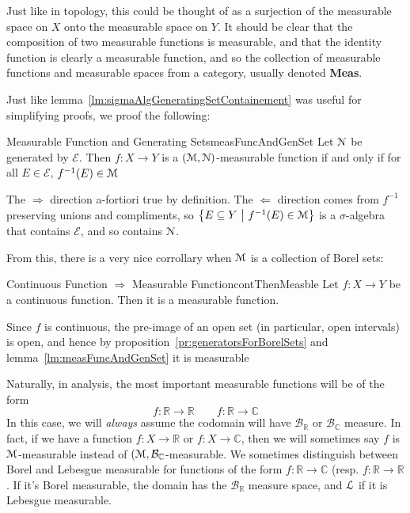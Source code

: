 \documentclass[oneside]{book}
\newcommand{\R}{\mathbb{R}}
\renewcommand{\C}{\mathbb{C}}
\newcommand{\CE}{\mathcal{E}}
\newcommand{\MM}{\EuScript{M}}
\newcommand{\EN}{\EuScript{N}}
\newcommand{\EL}{\EuScript{L}}
\newcommand{\BB}{\mathcal{B}}
\newcommand{\sse}{\subseteq}
\newcommand{\set}[2]{\left\{#1 \ \middle|\ #2\right\}}
\renewcommand{\bf}[1]{\textbf{#1}}
\newcommand{\rw}{\rightarrow}
\newcommand{\Rw}{\Rightarrow}
\newcommand{\Lw}{\Leftarrow}
\begin{document}
Just like in topology, this could be thought of as a surjection of the measurable space on $X$ onto the measurable space
on $Y$. It should be clear that the composition of two measurable functions is measurable, and that the identity
function is clearly a measurable function, and so the collection of measurable functions and measurable spaces from
a category, usually denoted \bf{Meas}. 

Just like lemma~\ref{lm:sigmaAlgGeneratingSetContainement} was useful for simplifying proofs, we proof the following:

\begin{lem}{Measurable Function and Generating Sets}{measFuncAndGenSet}
	Let $\EN$ be generated by $\CE$. Then $f: X \rw Y$ is a $(\MM, \EN)$-measurable function if and only if for all $E
	\in \CE$, $f^{-1}(E) \in \MM$
\end{lem}

\begin{Proof}
	The $\Rw$ direction a-fortiori true by definition. The $\Lw$ direction comes from $f^{-1}$ preserving unions and
	compliments, so $\set{E \sse Y}{f^{-1}(E) \in \MM}$ is a $\sigma$-algebra that contains $\CE$, and so contains
	$\EN$. 
\end{Proof}

From this, there is a very nice corrollary when $\MM$ is a collection of Borel sets:

\begin{cor}{Continuous Function $\Rw$ Measurable Function}{contThenMeasble}
	Let $f: X \rw Y$ be a continuous function. Then it is a measurable function. 
\end{cor}

\begin{Proof}
	Since $f$ is continuous, the pre-image of an open set (in particular, open intervals) is open, and hence by
	proposition~\ref{pr:generatorsForBorelSets} and lemma~\ref{lm:measFuncAndGenSet} it is measurable
\end{Proof}

Naturally, in analysis, the most important measurable functions will be of the form
\[
	f: \R \rw \R \qquad f: \R \rw \C
\]
In this case, we will \emph{always} assume the codomain will have $\BB_\R$ or $\BB_\C$ measure. In fact, if we have
a function $f: X \rw \R$ or $f: X \rw \C$, then we will sometimes say $f$ is $\MM$-measurable instead of $(\MM,
\BB_\C$-measurable. We sometimes distinguish between Borel and Lebesgue measurable for functions of the form $f: \R \rw
\C$ (resp. $f: \R \rw \R$. If it's Borel measurable, the domain has the $\BB_\R$ measure space, and $\EL$ if it is
Lebesgue measurable. 
\end{document}
